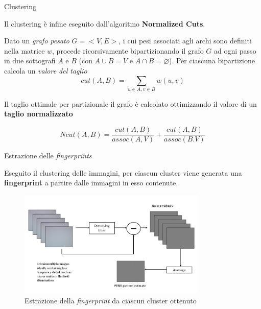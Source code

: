 \begin{tframe}{Clustering}

Il clustering è infine eseguito dall'algoritmo \textbf{Normalized Cuts}.
\vspace{0.3cm}

Dato un \emph{grafo pesato} $G = <V, E>$, i cui pesi associati agli archi sono definiti nella matrice $w$, procede ricorsivamente bipartizionando il grafo $G$ ad ogni passo in due sottografi $A$ e $B$ (con $A \cup B = V$ e $A \cap B = \varnothing$). Per ciascuna bipartizione calcola un \emph{valore del taglio
}
$$
cut(A, B) = \sum_{u \in A, v \in B} w(u, v)
$$

Il taglio ottimale per partizionale il grafo è calcolato ottimizzando il valore di un \textbf{taglio normalizzato}

$$Ncut(A, B) = \frac{cut(A, B)}{assoc(A, V)} + \frac{cut(A, B)}{assoc(B. V)}$$

\end{tframe}



\begin{tframe}{Estrazione delle \emph{fingerprints}}

Eseguito il clustering delle immagini, per ciascun cluster viene generata una \textbf{fingerprint} a partire dalle immagini in esso contenute.

\begin{figure}[h]
\begin{center}
\includegraphics[width=0.8\textwidth]{../images/prnu_extraction_2}
\end{center}
  \caption{Estrazione della \emph{fingerprint} da ciascun cluster ottenuto}
\label{fig:soglia AC}
\end{figure}
\end{tframe}